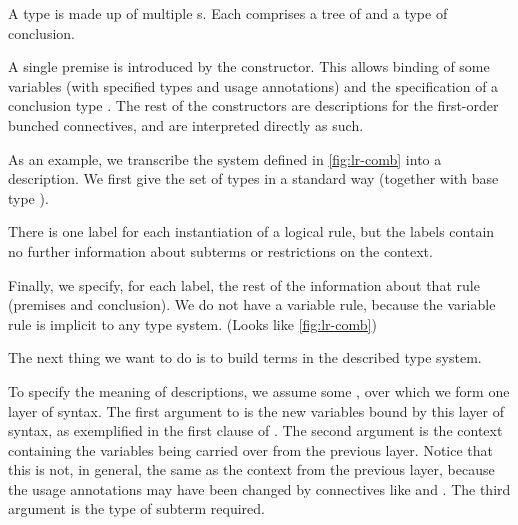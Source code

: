 A type  is made up of multiple s.
Each  comprises a tree of  and a type
of conclusion.

A single premise is introduced by the
 constructor.
This allows binding of some variables \AgdaBound{$\Delta$} (with specified
types and usage annotations) and the specification of a conclusion type
.
The rest of the constructors are descriptions for the first-order bunched
connectives, and are interpreted directly as such.


As an example, we transcribe the system defined in \cref{fig:lr-comb} into a
description.
We first give the set of types in a standard way (together with base type
\AgdaInductiveConstructor{$\iota$}).


There is one label for each instantiation of a logical rule, but the labels
contain no further information about subterms or restrictions on the context.


Finally, we specify, for each label, the rest of the information about that
rule {\color{red}(premises and conclusion)}.
We do not have a variable rule, because the variable rule is implicit to any
type system.
{\color{red}(Looks like \cref{fig:lr-comb})}


The next thing we want to do is to build terms in the described type system.


To specify the meaning of descriptions, we assume some
, over which we form one layer of syntax.
The first argument to  is the new variables bound by this layer
of syntax, as exemplified in the first clause of
.
The second argument is the context containing the variables being carried over
from the previous layer.
Notice that this is not, in general, the same as the context from the previous
layer, because the usage annotations may have been changed by connectives like
 and .
The third argument is the type of subterm required.

